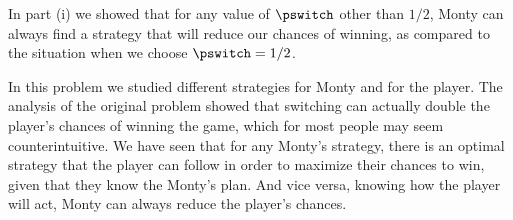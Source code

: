 In part (i) we showed that for any value of $\pswitch$ other than $1/2$, Monty can always find a strategy that will reduce our chances of winning, as compared to the situation when we choose $\pswitch=1/2$.

In this problem we studied different strategies for Monty and for the player.
The analysis of the original problem showed that switching can actually double the player's chances of winning the game, which for most people may seem counterintuitive.
We have seen that for any Monty's strategy, there is an optimal strategy that the player can follow in order to maximize their chances to win, given that they know the Monty's plan.
And vice versa, knowing how the player will act, Monty can always reduce the player's chances.
